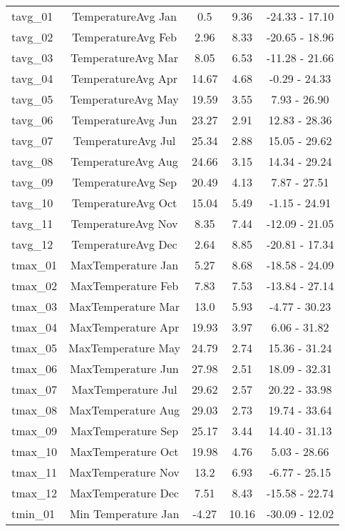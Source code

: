 \begin{table}[H]
\begin{tabular}{lcccc}
			tavg\_01 & TemperatureAvg Jan & 0.5 & 9.36 & -24.33 - 17.10 \\
			tavg\_02 & TemperatureAvg Feb & 2.96 & 8.33 & -20.65 - 18.96 \\
			tavg\_03 & TemperatureAvg Mar & 8.05 & 6.53 & -11.28 - 21.66 \\
			tavg\_04 & TemperatureAvg Apr & 14.67 & 4.68 & -0.29 - 24.33 \\
			tavg\_05 & TemperatureAvg May & 19.59 & 3.55 & 7.93 - 26.90 \\
			tavg\_06 & TemperatureAvg Jun & 23.27 & 2.91 & 12.83 - 28.36 \\
			tavg\_07 & TemperatureAvg Jul & 25.34 & 2.88 & 15.05 - 29.62 \\
			tavg\_08 & TemperatureAvg Aug & 24.66 & 3.15 & 14.34 - 29.24 \\
			tavg\_09 & TemperatureAvg Sep & 20.49 & 4.13 & 7.87 - 27.51 \\
			tavg\_10 & TemperatureAvg Oct & 15.04 & 5.49 & -1.15 - 24.91 \\
			tavg\_11 & TemperatureAvg Nov & 8.35 & 7.44 & -12.09 - 21.05 \\
			tavg\_12 & TemperatureAvg Dec & 2.64 & 8.85 & -20.81 - 17.34 \\
			tmax\_01 & MaxTemperature Jan & 5.27 & 8.68 & -18.58 - 24.09 \\
			tmax\_02 & MaxTemperature Feb & 7.83 & 7.53 & -13.84 - 27.14 \\
			tmax\_03 & MaxTemperature Mar & 13.0 & 5.93 & -4.77 - 30.23 \\
			tmax\_04 & MaxTemperature Apr & 19.93 & 3.97 & 6.06 - 31.82 \\
			tmax\_05 & MaxTemperature May & 24.79 & 2.74 & 15.36 - 31.24 \\
			tmax\_06 & MaxTemperature Jun & 27.98 & 2.51 & 18.09 - 32.31 \\
			tmax\_07 & MaxTemperature Jul & 29.62 & 2.57 & 20.22 - 33.98 \\
			tmax\_08 & MaxTemperature Aug & 29.03 & 2.73 & 19.74 - 33.64 \\
			tmax\_09 & MaxTemperature Sep & 25.17 & 3.44 & 14.40 - 31.13 \\
			tmax\_10 & MaxTemperature Oct & 19.98 & 4.76 & 5.03 - 28.66 \\
			tmax\_11 & MaxTemperature Nov & 13.2 & 6.93 & -6.77 - 25.15 \\
			tmax\_12 & MaxTemperature Dec & 7.51 & 8.43 & -15.58 - 22.74 \\
			tmin\_01 & Min Temperature Jan & -4.27 & 10.16 & -30.09 - 12.02 \\

\end{tabular}
\end{table}
